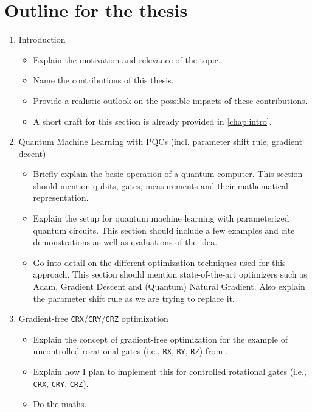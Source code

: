 \chapter{Outline for the thesis}

\begin{enumerate}
    \item Introduction
    \begin{itemize}
        \item
            Explain the motivation and relevance of the topic.
        \item
            Name the contributions of this thesis.
        \item
            Provide a realistic outlook on the possible impacts of these
            contributions.
        \item
            A short draft for this section is already provided in
            \autoref{chap:intro}.
    \end{itemize}

    \item Quantum Machine Learning with PQCs (incl. parameter shift rule, gradient decent)
    \begin{itemize}
        \item
            Briefly explain the basic operation of a quantum computer.
            This section should mention qubits, gates, measurements and their
            mathematical representation.
        \item
            Explain the setup for quantum machine learning with parameterized
            quantum circuits.
            This section should include a few examples and cite demonstrations
            as well as evaluations of the idea.
        \item
            Go into detail on the different optimization techniques used for
            this approach.
            This section should mention state-of-the-art optimizers such as
            Adam, Gradient Descent and (Quantum) Natural Gradient.
            Also explain the parameter shift rule \cite{mitarai_quantum_2018} as
            we are trying to replace it.
    \end{itemize}

    \item Gradient-free \texttt{CRX}/\texttt{CRY}/\texttt{CRZ} optimization
    \begin{itemize}
        \item
            Explain the concept of gradient-free optimization for the example of
            uncontrolled rorational gates (i.e., \texttt{RX}, \texttt{RY},
            \texttt{RZ}) from \cite{wendenius_gradient-free_2023}.
        \item
            Explain how I plan to implement this for controlled rotational gates
            (i.e., \texttt{CRX}, \texttt{CRY}, \texttt{CRZ}).
        \item
            Do the maths.
    \end{itemize}


\end{enumerate}
